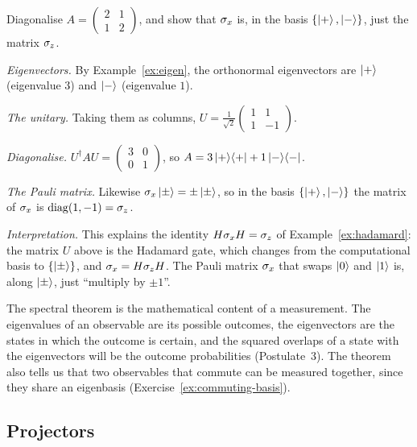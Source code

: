 \begin{example}\label{ex:diag}
  Diagonalise $A=\begin{pmatrix}2&1\\1&2\end{pmatrix}$, and show that $\sigma_x$ is, in the basis $\{\left|+\right\rangle,\left|-\right\rangle\}$, just the matrix $\sigma_z$.
\end{example}
\begin{solution}
  \begin{steps}
    \item \emph{Eigenvectors.} By Example~\ref{ex:eigen}, the orthonormal eigenvectors are $\left|+\right\rangle$ (eigenvalue $3$) and $\left|-\right\rangle$ (eigenvalue $1$).
    \item \emph{The unitary.} Taking them as columns, $U=\tfrac1{\sqrt2}\begin{pmatrix}1&1\\1&-1\end{pmatrix}$.
    \item \emph{Diagonalise.} $U^\dagger AU=\begin{pmatrix}3&0\\0&1\end{pmatrix}$, so $A=3\left|+\right\rangle\!\left\langle+\right|+1\left|-\right\rangle\!\left\langle-\right|$.
    \item \emph{The Pauli matrix.} Likewise $\sigma_x\left|\pm\right\rangle=\pm\left|\pm\right\rangle$, so in the basis $\{\left|+\right\rangle,\left|-\right\rangle\}$ the matrix of $\sigma_x$ is $\operatorname{diag}(1,-1)=\sigma_z$.
    \item \emph{Interpretation.} This explains the identity $H\sigma_x H=\sigma_z$ of Example~\ref{ex:hadamard}: the matrix $U$ above is the Hadamard gate, which changes from the computational basis to $\{\left|\pm\right\rangle\}$, and $\sigma_x=H\sigma_z H$. The Pauli matrix $\sigma_x$ that swaps $\left|0\right\rangle$ and $\left|1\right\rangle$ is, along $\left|\pm\right\rangle$, just ``multiply by $\pm1$''.
  \end{steps}
\end{solution}

\begin{lookahead}
  The spectral theorem is the mathematical content of a measurement. The eigenvalues of an observable are its possible outcomes, the eigenvectors are the states in which the outcome is certain, and the squared overlaps of a state with the eigenvectors will be the outcome probabilities (Postulate~3). The theorem also tells us that two observables that commute can be measured together, since they share an eigenbasis (Exercise~\ref{ex:commuting-basis}).
\end{lookahead}

\subsection{Projectors}

